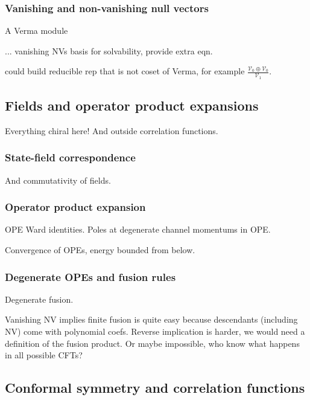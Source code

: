 \documentclass[12pt, a4paper]{article}
\theoremstyle{break}
\begin{document}
\subsubsection{Vanishing and non-vanishing null vectors}

A Verma module

... vanishing NVs basis for solvability, provide extra eqn.



could build reducible rep that is not coset of Verma, for example $\frac{\mathcal{V}_0 \oplus \mathcal{V}_0}{\mathcal{V}_1}$. 

\subsection{Fields and operator product expansions}

Everything chiral here! And outside correlation functions.

\subsubsection{State-field correspondence}

And commutativity of fields.

\subsubsection{Operator product expansion}\label{sec:ope}

OPE Ward identities. Poles at degenerate channel momentums in OPE. 

Convergence of OPEs, energy bounded from below.

\subsubsection{Degenerate OPEs and fusion rules}\label{sec:dope}

Degenerate fusion. 

Vanishing NV implies finite fusion is quite easy because descendants (including NV) come with polynomial coefs. Reverse implication is harder, we would need a definition of the fusion product. Or maybe impossible, who know what happens in all possible CFTs? 

\subsection{Conformal symmetry and correlation functions}
\end{document}
